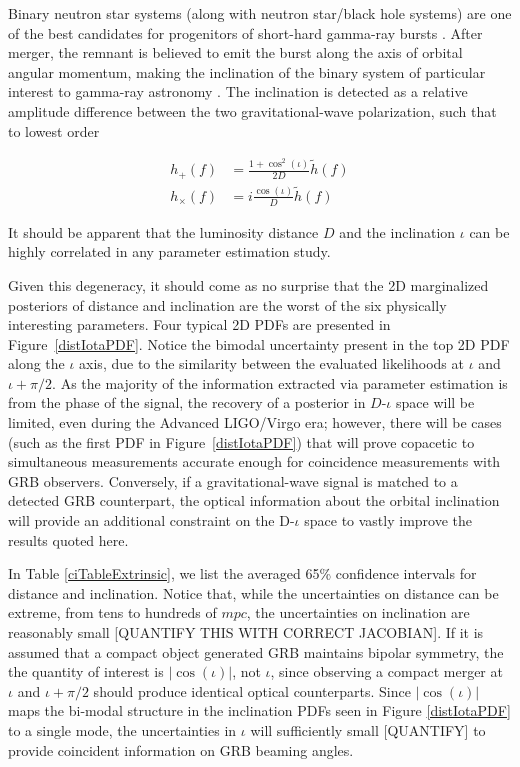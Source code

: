 \documentclass[11pt,a4paper]{emulateapj}
\newcommand{\carl}[1]{{\color{red}  #1}}
\begin{document}
Binary neutron star systems (along with neutron star/black hole systems) are one of the best candidates for progenitors of short-hard gamma-ray bursts \citep[and references therein]{Nakar2007}.  After merger, the remnant is believed to emit the burst along the axis of orbital angular momentum, making the inclination of the binary system of particular interest to gamma-ray astronomy \citep{LSCGRB2010,Corsi2012}.  The inclination is detected as a relative amplitude difference between the two gravitational-wave polarization, such that to lowest order

\begin{align}
h_+(f) &= \frac{1+\cos^2(\iota)}{2 D} \tilde{h}(f) \nonumber \\
h_\times(f) &= i \frac{\cos(\iota)}{D}\tilde{h}(f)
\end{align}

\noindent It should be apparent that the luminosity distance $D$ and the inclination $\iota$ can be highly correlated in any parameter estimation study.

Given this degeneracy, it should come as no surprise that the 2D marginalized posteriors of distance
 and inclination are the worst of the six physically interesting parameters.  Four typical 2D PDFs are
  presented in Figure~\ref{distIotaPDF}.  Notice the bimodal uncertainty 
present in the top 2D PDF along the $\iota$ axis, due to the similarity between the evaluated
 likelihoods at $\iota$ and $\iota + \pi/2$.  As the majority of the information extracted via parameter 
 estimation is from the phase of the signal, the recovery of a posterior in $D$-$\iota$ space will be 
 limited, even during the Advanced LIGO/Virgo era; however, there will be cases (such as the first 
 PDF in Figure~\ref{distIotaPDF})  that will prove copacetic to simultaneous measurements accurate 
 enough for coincidence measurements with GRB observers.  Conversely, if a gravitational-wave signal is 
 matched to a detected GRB counterpart, the optical information about the orbital inclination
 will provide an additional constraint on the D-$\iota$ space to vastly improve the results quoted here.
 
In Table \ref{ciTableExtrinsic}, we list the averaged 65\% confidence intervals for distance and inclination.  
Notice that, while the uncertainties on distance can be extreme, from tens to hundreds of $mpc$, the uncertainties
on inclination are reasonably small\carl{[QUANTIFY THIS WITH CORRECT JACOBIAN]}.  If it is assumed that a
 compact object generated GRB maintains bipolar symmetry, the the quantity of interest is $|\cos(\iota)|$, not 
 $\iota$, since observing a compact merger at $\iota$ and $\iota + \pi/2$ should produce identical optical counterparts.  
Since $|\cos(\iota)|$ maps the bi-modal structure in the inclination PDFs seen in Figure \ref{distIotaPDF} to a single
mode, the uncertainties in $\iota$ will sufficiently small \carl{[QUANTIFY]} to provide coincident information on
GRB beaming angles.
\end{document}
